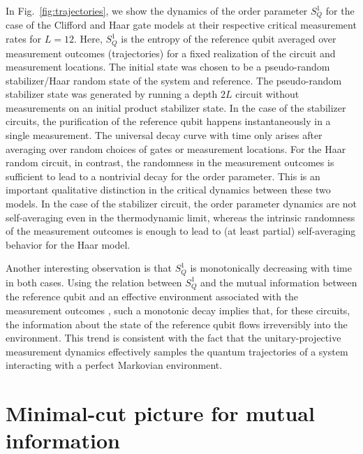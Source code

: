 \documentclass[prl,twocolumn,aps,showpacs,amsmath,amssymb,superscriptaddress,floatfix,longbibliography]{revtex4-1}
\begin{document}
In Fig.~\ref{fig:trajectories}, we show the dynamics of the order parameter $S_Q^1$ for the case of the Clifford and Haar gate models at their respective critical measurement rates for $L=12$.  Here, $S_Q^1$ is the entropy of the reference qubit averaged over measurement outcomes (trajectories) for a fixed realization of the circuit and measurement locations.  The initial state was chosen to be a pseudo-random stabilizer/Haar random state of the system and reference.  The pseudo-random stabilizer state was generated by running a depth $2L$ circuit without measurements on an initial product stabilizer state.  In the case of the stabilizer circuits, the purification of the reference qubit happens instantaneously in a single measurement.  The universal decay curve with time only arises after averaging over random choices of gates or measurement locations. For the Haar random circuit, in contrast, the randomness in the measurement outcomes is sufficient to lead to a nontrivial  decay for the order parameter.  This is an important qualitative distinction in the critical dynamics between these two models.  In the case of the stabilizer circuit, the order parameter dynamics are not self-averaging even in the thermodynamic limit, whereas the intrinsic randomness of the measurement outcomes is enough to lead to (at least partial) self-averaging behavior for the Haar model.  

Another interesting observation is that $S_Q^1$ is monotonically decreasing with time in both cases. Using the relation between  $S_Q^1$ and the mutual information between the reference qubit and an effective environment associated with the measurement outcomes \cite{Gullans2019b,Gullans2019,ChoiBaoQiAltman2019}, such a monotonic decay implies that, for these circuits, the information about the state of the reference qubit flows irreversibly into the environment.  This trend is consistent with the fact that the unitary-projective measurement dynamics effectively samples the quantum trajectories of a system interacting with a perfect Markovian environment.   


\section{Minimal-cut picture for mutual information}
\end{document}
